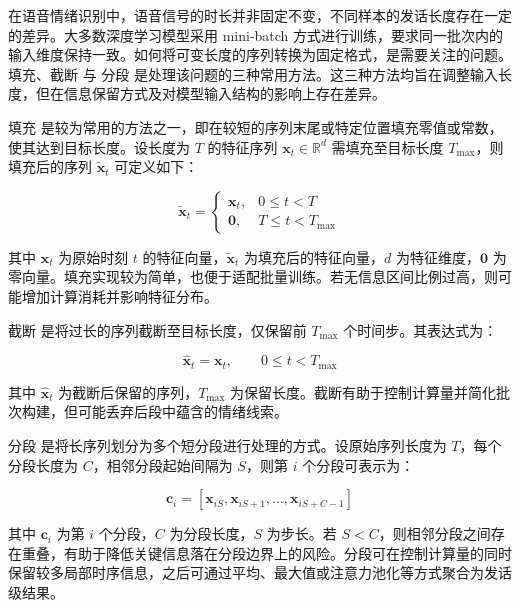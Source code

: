 在语音情绪识别中，语音信号的时长并非固定不变，不同样本的发话长度存在一定的差异。大多数深度学习模型采用 mini-batch 方式进行训练，要求同一批次内的输入维度保持一致\cite{zhang2020transfer,leem2024selective}。如何将可变长度的序列转换为固定格式，是需要关注的问题。填充、截断 与 分段 是处理该问题的三种常用方法\cite{ma2023review,lin2023chunk,peng2021efficient}。这三种方法均旨在调整输入长度，但在信息保留方式及对模型输入结构的影响上存在差异。

填充 是较为常用的方法之一，即在较短的序列末尾或特定位置填充零值或常数，使其达到目标长度\cite{ma2023review,lin2023chunk,peng2021efficient}。设长度为 $T$ 的特征序列 $\mathbf{x}_t \in \mathbb{R}^d$ 需填充至目标长度 $T_{\max}$，则填充后的序列 $\tilde{\mathbf{x}}_t$ 可定义如下：

\begin{equation}
\tilde{\mathbf{x}}_t =
\begin{cases}
\mathbf{x}_t, & 0 \le t < T \\
\mathbf{0}, & T \le t < T_{\max}
\end{cases}
\end{equation}


其中 $\mathbf{x}_t$ 为原始时刻 $t$ 的特征向量，$\tilde{\mathbf{x}}_t$ 为填充后的特征向量，$d$ 为特征维度，$\mathbf{0}$ 为零向量。填充实现较为简单，也便于适配批量训练。若无信息区间比例过高，则可能增加计算消耗并影响特征分布\cite{ma2023review,lin2023chunk}。

截断 是将过长的序列截断至目标长度，仅保留前 $T_{\max}$ 个时间步。其表达式为：

\begin{equation}
\hat{\mathbf{x}}_t = \mathbf{x}_t, \qquad 0 \le t < T_{\max}
\end{equation}

其中 $\hat{\mathbf{x}}_t$ 为截断后保留的序列，$T_{\max}$ 为保留长度。截断有助于控制计算量并简化批次构建，但可能丢弃后段中蕴含的情绪线索\cite{ma2023review,lin2023chunk}。

分段 是将长序列划分为多个短分段进行处理的方式\cite{ma2023review,lin2023chunk,peng2021efficient}。设原始序列长度为 $T$，每个分段长度为 $C$，相邻分段起始间隔为 $S$，则第 $i$ 个分段可表示为：

\begin{equation}
\mathbf{c}_i = \left[\mathbf{x}_{iS}, \mathbf{x}_{iS+1}, \dots, \mathbf{x}_{iS+C-1}\right]
\end{equation}

其中 $\mathbf{c}_i$ 为第 $i$ 个分段，$C$ 为分段长度，$S$ 为步长。若 $S < C$，则相邻分段之间存在重叠，有助于降低关键信息落在分段边界上的风险。分段可在控制计算量的同时保留较多局部时序信息，之后可通过平均、最大值或注意力池化等方式聚合为发话级结果\cite{ma2023review,peng2021efficient}。


